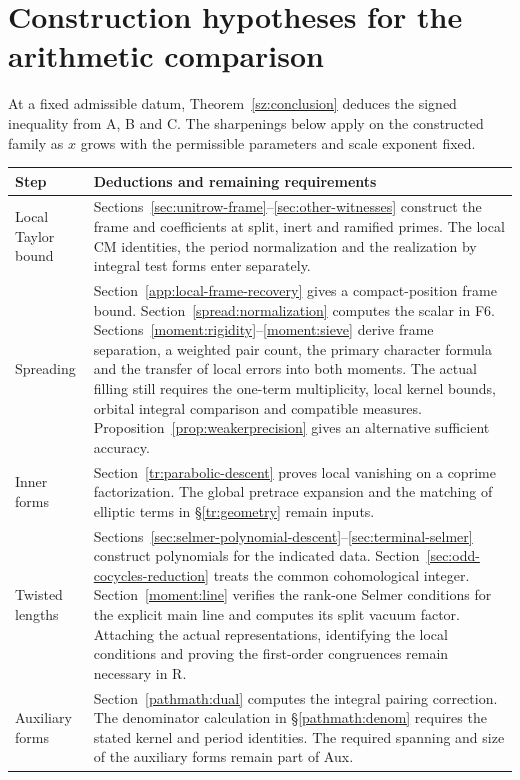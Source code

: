 \section{Construction hypotheses for the arithmetic comparison}\label{sz:register}
At a fixed admissible datum, Theorem~\ref{sz:conclusion} deduces the signed
inequality from A, B and C. The sharpenings below apply on the constructed
family as $x$ grows with the permissible parameters and scale exponent fixed.

\begin{longtable}{@{}>{\raggedright\arraybackslash}p{.19\linewidth}@{\hspace{.025\linewidth}}p{.755\linewidth}@{}}
\toprule Step & Deductions and remaining requirements\\\midrule\endhead
Local Taylor bound &
Sections~\ref{sec:unitrow-frame}--\ref{sec:other-witnesses} construct the frame and coefficients at split, inert and ramified primes. The local CM identities, the period normalization and the realization by integral test forms enter separately.\\[4pt]
Spreading &
Section~\ref{app:local-frame-recovery} gives a compact-position frame bound. Section~\ref{spread:normalization} computes the scalar in F6. Sections~\ref{moment:rigidity}--\ref{moment:sieve} derive frame separation, a weighted pair count, the primary character formula and the transfer of local errors into both moments. The actual filling still requires the one-term multiplicity, local kernel bounds, orbital integral comparison and compatible measures. Proposition~\ref{prop:weakerprecision} gives an alternative sufficient accuracy.\\[4pt]
Inner forms &
Section~\ref{tr:parabolic-descent} proves local vanishing on a coprime factorization. The global pretrace expansion and the matching of elliptic terms in \S\ref{tr:geometry} remain inputs.\\[4pt]
Twisted lengths &
Sections~\ref{sec:selmer-polynomial-descent}--\ref{sec:terminal-selmer} construct polynomials for the indicated data. Section~\ref{sec:odd-cocycles-reduction} treats the common cohomological integer. Section~\ref{moment:line} verifies the rank-one Selmer conditions for the explicit main line and computes its split vacuum factor. Attaching the actual representations, identifying the local conditions and proving the first-order congruences remain necessary in R.\\[4pt]
Auxiliary forms &
Section~\ref{pathmath:dual} computes the integral pairing correction. The denominator calculation in \S\ref{pathmath:denom} requires the stated kernel and period identities. The required spanning and size of the auxiliary forms remain part of Aux.\\\bottomrule
\end{longtable}
